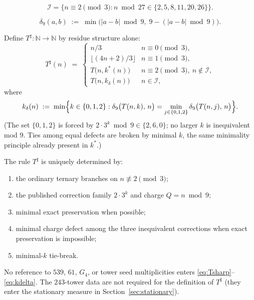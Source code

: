 \begin{definition}
\[
\mathcal{I}
=\bigl\{n\equiv 2\pmod{3}:
n\bmod 27\in\{2,5,8,11,20,26\}\bigr\}.
\]
\end{definition}

\begin{definition}
\label{def:defect}
\[
\delta_9(a,b)
\;:=\;
\min\bigl(|a-b|\bmod 9,\; 9-(|a-b|\bmod 9)\bigr).
\]
\end{definition}

\begin{definition}
\label{def:Tsharp}
Define \(T^\sharp:\mathbb{N}\to\mathbb{N}\) by residue structure alone:
\begin{equation}
\label{eq:Tsharp}
T^\sharp(n)
\;=\;
\begin{cases}
n/3 & n\equiv 0\pmod{3},\\[4pt]
\lfloor(4n+2)/3\rfloor & n\equiv 1\pmod{3},\\[4pt]
T\bigl(n,k^\ast(n)\bigr)
  & n\equiv 2\pmod{3},\ n\notin\mathcal{I},\\[4pt]
T\bigl(n,k_\delta(n)\bigr)
  & n\in\mathcal{I},
\end{cases}
\end{equation}
where
\begin{equation}
\label{eq:kdelta}
k_\delta(n)
\;:=\;
\min\Bigl\{
k\in\{0,1,2\}
:
\delta_9\bigl(T(n,k),\,n\bigr)
=
\min_{j\in\{0,1,2\}}
\delta_9\bigl(T(n,j),\,n\bigr)
\Bigr\}.
\end{equation}
(The set \(\{0,1,2\}\) is forced by \(2\cdot 3^{k}\bmod 9\in\{2,6,0\}\); no
larger \(k\) is inequivalent mod \(9\). Ties among equal defects are broken by
minimal \(k\), the same minimality principle already present in \(k^\ast\).)
\end{definition}

\begin{theorem}
\label{thm:completion-derived}
The rule \(T^\sharp\) is uniquely determined by:
\begin{enumerate}[label=(\roman*)]
  \item the ordinary ternary branches on \(n\not\equiv 2\pmod{3}\);
  \item the published correction family \(2\cdot 3^{k}\) and charge \(Q=n\bmod 9\);
  \item minimal exact preservation when possible;
  \item minimal charge defect among the three inequivalent corrections when
        exact preservation is impossible;
  \item minimal-\(k\) tie-break.
\end{enumerate}
No reference to \(539\), \(61\), \(G_4\), or tower seed multiplicities enters
\eqref{eq:Tsharp}--\eqref{eq:kdelta}. The \(243\)-tower data are not required
for the definition of \(T^\sharp\) (they enter the stationary measure in
Section~\ref{sec:stationary}).
\end{theorem}

